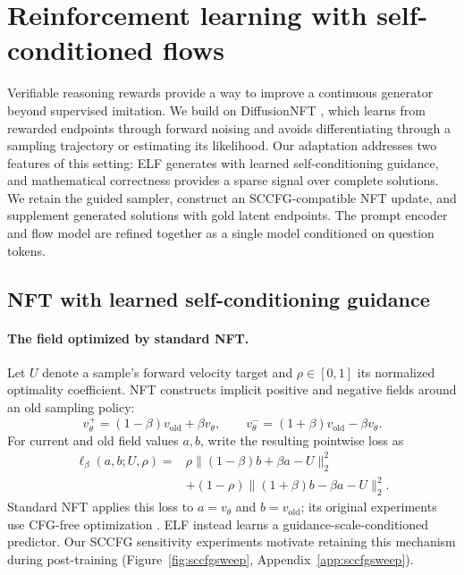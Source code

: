 \section{Reinforcement learning with self-conditioned flows}
\label{sec:nft}

Verifiable reasoning rewards provide a way to improve a continuous generator beyond supervised imitation. We build on DiffusionNFT \citep{diffusionnft}, which learns from rewarded endpoints through forward noising and avoids differentiating through a sampling trajectory or estimating its likelihood. Our adaptation addresses two features of this setting: ELF generates with learned self-conditioning guidance, and mathematical correctness provides a sparse signal over complete solutions. We retain the guided sampler, construct an SCCFG-compatible NFT update, and supplement generated solutions with gold latent endpoints. The prompt encoder and flow model are refined together as a single model conditioned on question tokens.

\subsection{NFT with learned self-conditioning guidance}
\label{sec:nftsccfg}

\paragraph{The field optimized by standard NFT.}
Let $U$ denote a sample's forward velocity target and $\rho\in[0,1]$ its normalized optimality coefficient. NFT constructs implicit positive and negative fields around an old sampling policy:
\begin{equation}
 v_\theta^+=(1-\beta)v_{\mathrm{old}}+\beta v_\theta,
 \qquad
 v_\theta^-=(1+\beta)v_{\mathrm{old}}-\beta v_\theta.
 \label{eq:nftimplicitfields}
\end{equation}
For current and old field values $a,b$, write the resulting pointwise loss as
\begin{equation}
\begin{split}
 \ell_\beta(a,b;U,\rho)
 ={}&\rho\|(1-\beta)b+\beta a-U\|_2^2\\
 &+(1-\rho)\|(1+\beta)b-\beta a-U\|_2^2.
\end{split}
\label{eq:nftquadratic}
\end{equation}
Standard NFT applies this loss to $a=v_\theta$ and $b=v_{\mathrm{old}}$; its original experiments use CFG-free optimization \citep{diffusionnft}. ELF instead learns a guidance-scale-conditioned predictor. Our SCCFG sensitivity experiments motivate retaining this mechanism during post-training (Figure~\ref{fig:sccfgsweep}, Appendix~\ref{app:sccfgsweep}).

